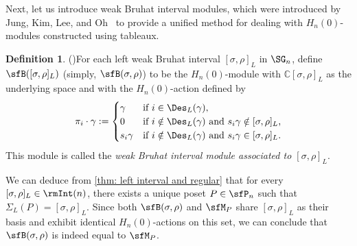\documentclass[12pt, reqno]{amsart}
\theoremstyle{definition}
\newtheorem{definition}[theorem]{Definition}
\numberwithin{equation}{section} \numberwithin{figure}{section}
\numberwithin{table}{section}
\def\C{\mathbb C}
\begin{document}
Next, let us introduce weak Bruhat interval modules, which were introduced by Jung, Kim, Lee, and Oh~\cite{22JKLO} to provide a unified method for dealing with  $H_n(0)$-modules constructed using tableaux.


\begin{definition}{\rm (\cite[Definition 1]{22JKLO})}\label{def: WBI action}
For each left weak Bruhat interval $[\sigma, \rho]_L$ in $\SG_n$,
define $\sfB([\sigma, \rho]_L)$ (simply, $\sfB(\sigma, \rho)$) to be  the $H_n(0)$-module with  $\C[\sigma,\rho]_L$ as the underlying space and with the $H_n(0)$-action defined by
\begin{align*}
\pi_i \cdot \gamma := \begin{cases}
\gamma & \text{if $i \in \Des_L(\gamma)$}, \\
0 & \text{if $i \notin \Des_L(\gamma)$ and $s_i\gamma \notin [\sigma,\rho]_L$,} \\
s_i \gamma & \text{if $i \notin \Des_L(\gamma)$ and $s_i\gamma \in [\sigma,\rho]_L$}.
\end{cases} 
\end{align*}
This module is called the \emph{weak Bruhat interval module associated to $[\sigma,\rho]_L$}.
\end{definition}



We can deduce from \cref{thm: left interval and regular} that for every $[\sigma, \rho]_L \in \rmInt(n)$, there exists a unique poset $P\in \sfP_n$ such that $\Sigma_L(P)=[\sigma, \rho]_L$. Since both $\sfB(\sigma, \rho)$ and $\sfM_P$ share $[\sigma, \rho]_L$ as their basis and exhibit identical $H_n(0)$-actions on this set, we can conclude that $\sfB(\sigma, \rho)$ is indeed equal to $\sfM_P$.
\end{document}
